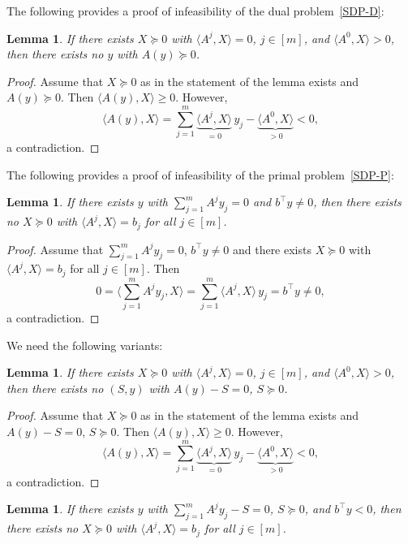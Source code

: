 \documentclass[10pt, a4paper]{article}
\newcommand{\skal}[2]{\langle{#1},{#2}\rangle}
\newcommand{\T}{^{\top}}
\newtheorem{lemma}[theorem]{Lemma}
\begin{document}
The following provides a proof of infeasibility of the dual problem~\eqref{SDP-D}:

\begin{lemma}\label{lemma:DualInfCertificate}
  If there exists $X \succeq 0$ with $\skal{A^j}{X} = 0$, $j \in [m]$, and
  $\skal{A^0}{X} > 0$, then there exists no $y$ with $A(y) \succeq 0$.
\end{lemma}

\begin{proof}
  Assume that $X \succeq 0$ as in the statement of the lemma exists and
  $A(y) \succeq 0$.  Then $\skal{A(y)}{X} \geq 0$. However,
  \[
  \skal{A(y)}{X} = \sum_{j=1}^m \underbrace{\skal{A^j}{X}}_{= 0}\, y_j -
  \underbrace{\skal{A^0}{X}}_{> 0} < 0,
  \]
  a contradiction.
\end{proof}

The following provides a proof of infeasibility of the primal problem~\eqref{SDP-P}:

\begin{lemma}\label{lemma:PrimalInfCertificate}
  If there exists $y$ with $\sum_{j=1}^m A^j y_j = 0$ and $b\T y \neq 0$, then
  there exists no $X \succeq 0$ with $\skal{A^j}{X} = b_j$ for all
  $j \in [m]$.
\end{lemma}

\begin{proof}
  Assume that $\sum_{j=1}^m A^j y_j = 0$, $b\T y \neq 0$ and there exists
  $X \succeq 0$ with $\skal{A^j}{X} = b_j$ for all $j \in [m]$. Then
  \[
  0 = \skal{\sum_{j=1}^m A^j y_j}{X} = \sum_{j=1}^m \skal{A^j}{X}\, y_j =
  b\T y \neq 0,
  \]
  a contradiction.
\end{proof}

We need the following variants:

\begin{lemma}\label{lemma:DualInfCertificate2}
  If there exists $X \succeq 0$ with $\skal{A^j}{X} = 0$, $j \in [m]$, and
  $\skal{A^0}{X} > 0$, then there exists no $(S,y)$ with $A(y) - S = 0$,
  $S \succeq 0$.
\end{lemma}

\begin{proof}
  Assume that $X \succeq 0$ as in the statement of the lemma exists and
  $A(y) - S = 0$, $S \succeq 0$.  Then $\skal{A(y)}{X} \geq 0$. However,
  \[
  \skal{A(y)}{X} = \sum_{j=1}^m \underbrace{\skal{A^j}{X}}_{= 0}\, y_j -
  \underbrace{\skal{A^0}{X}}_{> 0} < 0,
  \]
  a contradiction.
\end{proof}

\begin{lemma}\label{lemma:PrimalInfCertificate2}
  If there exists $y$ with $\sum_{j=1}^m A^j y_j - S = 0$, $S \succeq 0$,
  and $b\T y < 0$, then there exists no $X \succeq 0$ with
  $\skal{A^j}{X} = b_j$ for all $j \in [m]$.
\end{lemma}
\end{document}
